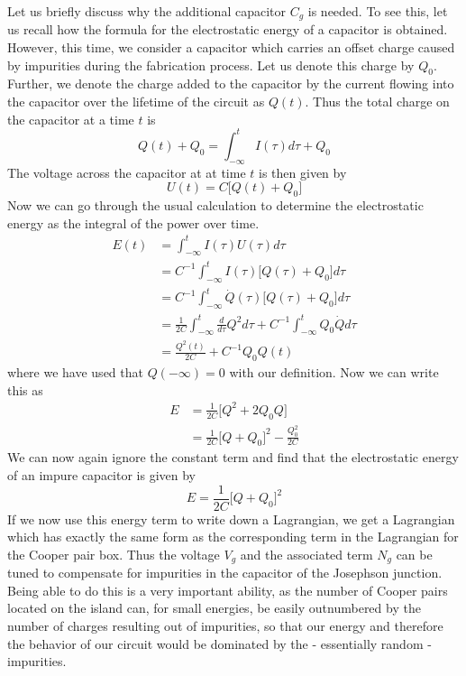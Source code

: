 \documentclass[a4paper, draft]{article}
\theoremstyle{own}
\theoremstyle{remark}
\begin{document}
Let us briefly discuss why the additional capacitor $C_g$ is needed.
To see this, let us recall how the formula for the electrostatic energy of a capacitor is obtained. However, this time, we consider a capacitor which carries an offset charge caused by impurities during the fabrication process. Let us denote this charge by $Q_0$. Further, we denote the charge added to the capacitor by the current flowing into the capacitor over the lifetime of the circuit as $Q(t)$. Thus the total charge on the capacitor at a time $t$ is
$$
Q(t) + Q_0 = \int_{-\infty}^{t} I(\tau) d\tau + Q_0
$$
The voltage across the capacitor at at time $t$ is then given by
$$
U(t) = C \big[ Q(t) + Q_0 \big]
$$
Now we can go through the usual calculation to determine the electrostatic energy as the integral of the power over time.
\begin{align*}
E(t) &= \int_{-\infty}^{t} I(\tau) U(\tau) d\tau \\
&= C^{-1} \int_{-\infty}^{t} I(\tau) \big[ Q(\tau) + Q_0 \big] d\tau \\
&= C^{-1} \int_{-\infty}^{t} \dot{Q}(\tau) \big[ Q(\tau) + Q_0 \big] d\tau \\
&= \frac{1}{2C} \int_{-\infty}^{t} \frac{d}{d\tau} Q^2 d \tau 
+ 
C^{-1} \int_{-\infty}^{t} Q_0 \dot{Q} d\tau \\&= \frac{Q^2(t)}{2C}
+
C^{-1} Q_0 Q(t)
\end{align*}
where we have used that $Q(-\infty) = 0$ with our definition. Now we can write this as
\begin{align*}
E &= \frac{1}{2C} \big[ Q^2 + 2 Q_0 Q\big] \\
&= \frac{1}{2C} \big[ Q +  Q_0 \big]^2 - \frac{Q_0^2}{2C}
\end{align*}
We can now again ignore the constant term and find that the electrostatic energy of an impure capacitor is given by
$$
E = \frac{1}{2C} \big[ Q +  Q_0 \big]^2
$$
If we now use this energy term to write down a Lagrangian, we get a Lagrangian which has exactly the same form as the corresponding term in the Lagrangian for the Cooper pair box. Thus the voltage $V_g$ and the associated term $N_g$ can be tuned to compensate for impurities in the capacitor of the Josephson junction. Being able to do this is a very important ability, as the number of Cooper pairs located on the island can, for small energies, be easily outnumbered by the number of charges resulting out of impurities, so that our energy and therefore the behavior of our circuit would be dominated by the - essentially random - impurities.
\end{document}
